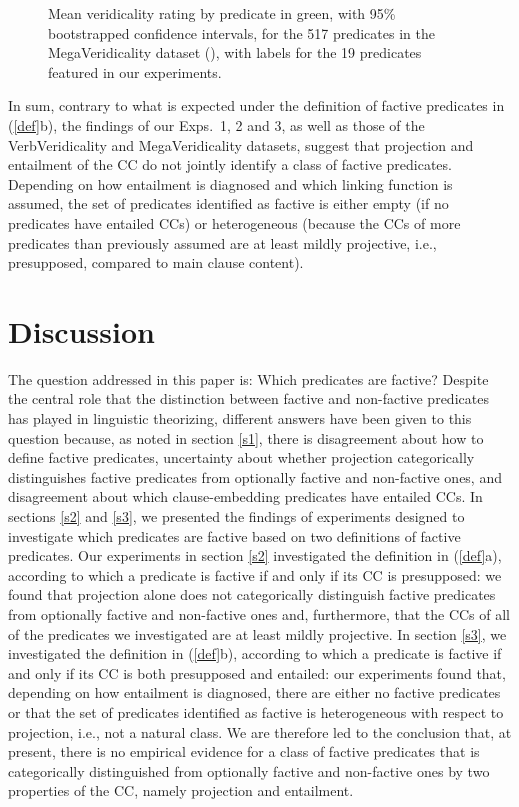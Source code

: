\documentclass[11pt,fleqn]{article}
\newcommand{\6}{\mbox{$[\hspace*{-.6mm}[$}}
\newcommand{\9}{\mbox{$]\hspace*{-.6mm}]$}}
\begin{document}
{\begin{figure}[H]
\caption{Mean veridicality rating by predicate in green, with 95\% bootstrapped confidence intervals, for the 517 predicates in the MegaVeridicality dataset (\citealt{white-rawlins-nels2018,white-etal2018b}), with labels for the 19 predicates featured in our experiments.}
\label{f-white-rawlins-ent}
\end{figure}

In sum, contrary to what is expected under the definition of factive predicates in (\ref{def}b), the findings of our Exps.~1, 2 and 3, as well as those of the VerbVeridicality and MegaVeridicality datasets, suggest that projection and entailment of the CC do not jointly identify a class of factive predicates. Depending on how entailment is diagnosed and which linking function is assumed, the set of predicates identified as factive is either empty (if no predicates have entailed CCs) or heterogeneous (because the CCs of more predicates than previously assumed are at least mildly projective, i.e., presupposed, compared to main clause content). 

\section{Discussion}\label{s4}

The question addressed in this paper is: Which predicates are factive? Despite the central role that the distinction between factive and non-factive predicates has played in linguistic theorizing, different answers have been given to this question because, as noted in section \ref{s1}, there is disagreement about how to define factive predicates, uncertainty about whether projection categorically distinguishes factive predicates from optionally factive and non-factive ones, and disagreement about which clause-embedding predicates have entailed CCs. In sections \ref{s2} and \ref{s3}, we presented the findings of experiments designed to investigate which predicates are factive based on  two definitions of factive predicates. Our experiments in section \ref{s2} investigated the definition in (\ref{def}a), according to which a predicate is factive if and only if its CC is presupposed: we found that projection alone does not categorically distinguish factive predicates from optionally factive and non-factive ones and, furthermore, that the CCs of all of the predicates we investigated are at least mildly projective. In section \ref{s3}, we investigated the definition in (\ref{def}b), according to which a predicate is factive if and only if its CC is both presupposed and entailed: our experiments found that, depending on how entailment is diagnosed, there are either no factive predicates or that the set of predicates identified as factive is heterogeneous with respect to projection, i.e., not a natural class. We are therefore led to the conclusion that, at present, there is no empirical evidence for a class of factive predicates that is categorically distinguished from optionally factive and non-factive ones by two properties of the CC, namely projection and entailment. 

}
\end{document}
